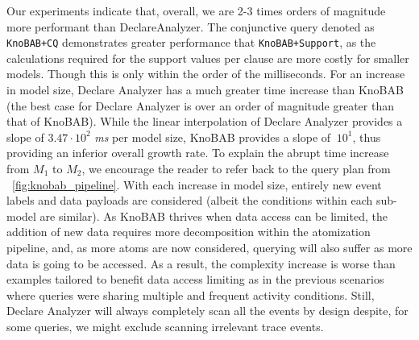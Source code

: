 Our experiments indicate that, overall, we are 2-3 times orders of magnitude more performant than DeclareAnalyzer. The conjunctive query denoted as \texttt{KnoBAB+CQ} demonstrates greater performance that \texttt{KnoBAB+Support}, as the calculations required for the support values per clause are more costly for smaller models. Though this is only within the order of the milliseconds. For an increase in model size, Declare Analyzer has a much greater time increase than KnoBAB (the best case for Declare Analyzer is over an order of magnitude greater than that of KnoBAB). %
While the linear interpolation of Declare Analyzer provides a slope of $3.47\cdot 10^2$ \textit{ms} per model size, KnoBAB provides a slope of $~10^1$, thus providing an inferior overall growth rate. To explain the abrupt time increase from $M_1$ to $M_2$, we encourage the reader to refer back to the query plan from \figurename~\ref{fig:knobab_pipeline}.%
With each increase in model size, entirely new event labels and data payloads are considered (albeit the conditions within each sub-model are similar). As KnoBAB thrives when data access can be limited, the addition of new data requires more decomposition within the atomization pipeline, and, as more atoms are now considered, querying will also suffer as more data is going to be accessed. As a result, the complexity increase is worse than examples tailored to benefit data access limiting as in the previous scenarios where queries were sharing multiple and frequent activity conditions. Still, Declare Analyzer will always completely scan all the events by design despite, for some queries, we might exclude scanning irrelevant trace events.



